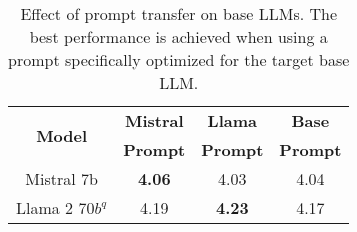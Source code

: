 \begin{table}[!t]
\begin{center}
\begin{tabular}{ c c c c } 
    \toprule
    \multirow{2}{*}{\textbf{Model}} & \textbf{Mistral}  & \textbf{Llama}  & \textbf{Base} \\
    & \textbf{Prompt} & \textbf{Prompt} & \textbf{Prompt} \\
    \midrule
    Mistral 7b & \textbf{4.06} & 4.03 & 4.04 \\
    Llama 2 70$b^q$ & 4.19 & \textbf{4.23} & 4.17 \\
    \bottomrule
\end{tabular}
\caption{Effect of prompt transfer on base LLMs. The best performance is achieved when using a prompt specifically optimized for the target base LLM.}
\label{tab:prompt_transfer}
\vspace{-17pt}
\end{center}
\end{table}